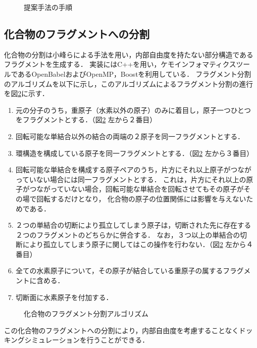 \begin{figure}[p]
 \begin{center}
  \caption{提案手法の手順}
  \label{fig:workflow}
 \end{center}
\end{figure}

\subsection{化合物のフラグメントへの分割}\label{subsec:decomposition}
化合物の分割は小峰らによる手法\cite{Shunta2015}を用い，内部自由度を持たない部分構造であるフラグメントを生成する．
実装にはC++を用い，ケモインフォマティクスツールであるOpenBabel\cite{OBoyle2011}およびOpenMP，Boostを利用している．
フラグメント分割のアルゴリズムを以下に示し，このアルゴリズムによるフラグメント分割の進行を図\ref{fig:decomposition}に示す．
\begin{enumerate} 
\item 元の分子のうち，重原子（水素以外の原子）のみに着目し，原子一つひとつをフラグメントとする．（図\ref{fig:decomposition} 左から２番目）
\item 回転可能な単結合以外の結合の両端の２原子を同一フラグメントとする．
\item 環構造を構成している原子を同一フラグメントとする．（図\ref{fig:decomposition} 左から３番目）
\item 回転可能な単結合を構成する原子ペアのうち，片方にそれ以上原子がつながっていない場合には同一フラグメントとする．
	これは，片方にそれ以上の原子がつながっていない場合，回転可能な単結合を回転させてもその原子がその場で回転するだけとなり，
	化合物の原子の位置関係には影響を与えないためである．
\item ２つの単結合の切断により孤立してしまう原子は，切断された先に存在する２つのフラグメントのどちらかに併合する．
	なお，３つ以上の単結合の切断により孤立してしまう原子に関してはこの操作を行わない．（図\ref{fig:decomposition} 左から４番目）
\item 全ての水素原子について，その原子が結合している重原子の属するフラグメントに含める．
\item 切断面に水素原子を付加する．
\end{enumerate}
\begin{figure}[htp]
 \begin{center}
  \caption{化合物のフラグメント分割アルゴリズム\cite{Shunta2015}}
  \label{fig:decomposition}
 \end{center}
\end{figure}
この化合物のフラグメントへの分割により，内部自由度を考慮することなくドッキングシミュレーションを行うことができる．

